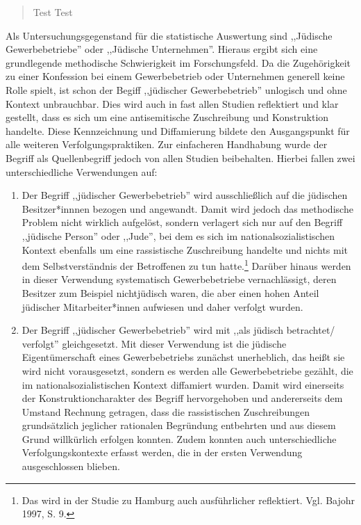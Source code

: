 \begin{quotation}
    Test Test
    
\end{quotation}



Als Untersuchungsgegenstand für die statistische Auswertung sind ,,Jüdische Gewerbebetriebe'' oder ,,Jüdische Unternehmen''. Hieraus ergibt sich eine grundlegende methodische Schwierigkeit im Forschungsfeld. Da die Zugehörigkeit zu einer Konfession bei einem Gewerbebetrieb oder Unternehmen generell keine Rolle spielt, ist schon der Begiff ,,jüdischer Gewerbebetrieb'' unlogisch und ohne Kontext unbrauchbar. Dies wird auch in fast allen Studien reflektiert und klar gestellt, dass es sich um eine antisemitische Zuschreibung und Konstruktion handelte. Diese Kennzeichnung und Diffamierung bildete den Ausgangspunkt für alle weiteren Verfolgungspraktiken. Zur einfacheren Handhabung wurde der Begriff als Quellenbegriff jedoch von allen Studien beibehalten. Hierbei fallen zwei unterschiedliche Verwendungen auf: 

\begin{enumerate}
    \item Der Begriff ,,jüdischer Gewerbebetrieb'' wird ausschließlich auf die jüdischen Besitzer*innnen bezogen und angewandt. Damit wird jedoch das methodische Problem nicht wirklich aufgelöst, sondern verlagert sich nur auf den Begriff ,,jüdische Person'' oder ,,Jude'', bei dem es sich im nationalsozialistischen Kontext ebenfalls um eine rassistische Zuschreibung handelte und nichts mit dem Selbstverständnis der Betroffenen zu tun hatte.\footnote{Das wird in der Studie zu Hamburg auch ausführlicher reflektiert. Vgl. Bajohr 1997, S. 9.} Darüber hinaus werden in dieser Verwendung systematisch Gewerbebetriebe vernachlässigt, deren Besitzer zum Beispiel nichtjüdisch waren, die aber einen hohen Anteil jüdischer Mitarbeiter*innen aufwiesen und daher verfolgt wurden. 
    \item Der Begriff ,,jüdischer Gewerbebetrieb'' wird mit ,,als jüdisch betrachtet/ verfolgt'' gleichgesetzt. Mit dieser Verwendung ist die jüdische Eigentümerschaft eines Gewerbebetriebs zunächst unerheblich, das heißt sie wird nicht vorausgesetzt, sondern es werden alle Gewerbebetriebe gezählt, die im nationalsozialistischen Kontext diffamiert wurden. Damit wird einerseits der Konstruktioncharakter des Begriff hervorgehoben und andererseits dem Umstand Rechnung getragen, dass die rassistischen Zuschreibungen grundsätzlich jeglicher rationalen Begründung entbehrten und aus diesem Grund willkürlich erfolgen konnten. Zudem konnten auch unterschiedliche Verfolgungskontexte erfasst werden, die in der ersten Verwendung ausgeschlossen blieben.
\end{enumerate}

